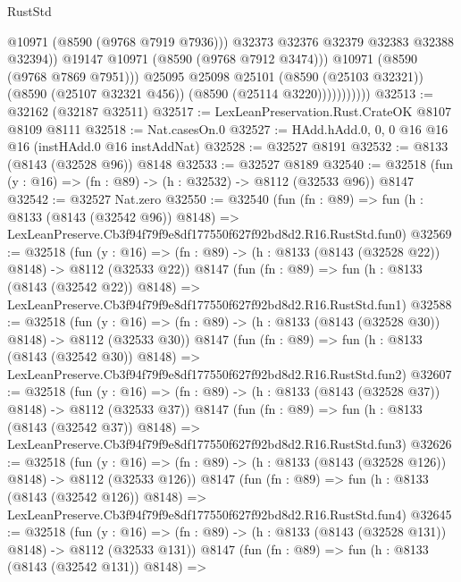 \begin{lexlean}{RustStd}
\begin{coremodule}
                                @10971
                                (@8590 (@9768 @7919 @7936)))
                              @32373
                              @32376
                              @32379
                              @32383
                              @32388
                              @32394))
                          @19147
                          @10971
                          (@8590 (@9768 @7912 @3474)))
                        @10971
                        (@8590 (@9768 @7869 @7951)))
                      @25095
                      @25098
                      @25101
                      (@8590 (@25103 @32321))
                      (@8590 (@25107 @32321 @456))
                      (@8590 (@25114 @3220)))))))))))
@32513 := @32162 (@32187 @32511)
@32517 := LexLeanPreservation.Rust.CrateOK @8107 @8109 @8111
@32518 := Nat.casesOn.{0}
@32527 := HAdd.hAdd.{0, 0, 0} @16 @16 @16 (instHAdd.{0} @16 instAddNat)
@32528 := @32527 @8191
@32532 := @8133 (@8143 (@32528 @96)) @8148
@32533 := @32527 @8189
@32540 := @32518 (fun (y : @16) => (fn : @89) -> (h : @32532) -> @8112 (@32533 @96)) @8147
@32542 := @32527 Nat.zero
@32550 := @32540
    (fun (fn : @89) =>
    fun (h : @8133 (@8143 (@32542 @96)) @8148) =>
    LexLeanPreserve.Cb3f94f79f9e8df177550f627f92bd8d2.R16.RustStd.fun0)
@32569 := @32518
    (fun (y : @16) => (fn : @89) -> (h : @8133 (@8143 (@32528 @22)) @8148) -> @8112 (@32533 @22))
    @8147
    (fun (fn : @89) =>
    fun (h : @8133 (@8143 (@32542 @22)) @8148) =>
    LexLeanPreserve.Cb3f94f79f9e8df177550f627f92bd8d2.R16.RustStd.fun1)
@32588 := @32518
    (fun (y : @16) => (fn : @89) -> (h : @8133 (@8143 (@32528 @30)) @8148) -> @8112 (@32533 @30))
    @8147
    (fun (fn : @89) =>
    fun (h : @8133 (@8143 (@32542 @30)) @8148) =>
    LexLeanPreserve.Cb3f94f79f9e8df177550f627f92bd8d2.R16.RustStd.fun2)
@32607 := @32518
    (fun (y : @16) => (fn : @89) -> (h : @8133 (@8143 (@32528 @37)) @8148) -> @8112 (@32533 @37))
    @8147
    (fun (fn : @89) =>
    fun (h : @8133 (@8143 (@32542 @37)) @8148) =>
    LexLeanPreserve.Cb3f94f79f9e8df177550f627f92bd8d2.R16.RustStd.fun3)
@32626 := @32518
    (fun (y : @16) => (fn : @89) -> (h : @8133 (@8143 (@32528 @126)) @8148) -> @8112 (@32533 @126))
    @8147
    (fun (fn : @89) =>
    fun (h : @8133 (@8143 (@32542 @126)) @8148) =>
    LexLeanPreserve.Cb3f94f79f9e8df177550f627f92bd8d2.R16.RustStd.fun4)
@32645 := @32518
    (fun (y : @16) => (fn : @89) -> (h : @8133 (@8143 (@32528 @131)) @8148) -> @8112 (@32533 @131))
    @8147
    (fun (fn : @89) =>
    fun (h : @8133 (@8143 (@32542 @131)) @8148) =>

\end{coremodule}
\end{lexlean}
